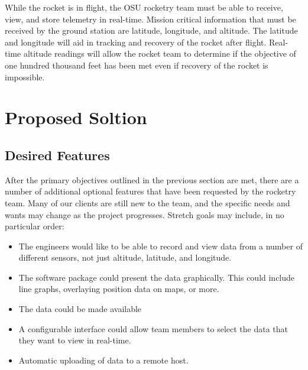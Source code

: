 \documentclass[10pt,journal,draftclsnofoot,onecolumn]{IEEEtran}
\begin{document}
While the rocket is in flight, the \ac{OSU} rocketry team
must be able to receive, view, and store telemetry in real-time.
Mission critical information that must be received by the ground
station are latitude, longitude, and altitude. The latitude
and longitude will aid in tracking and recovery of the rocket
after flight. Real-time altitude readings will allow the rocket
team to determine if the objective of one hundred thousand feet
has been met even if recovery of the rocket is impossible.


\section{Proposed Soltion}

\subsection{Desired Features}
After the primary objectives outlined in the previous section
are met, there are a number of additional optional features
that have been requested by the rocketry team.
Many of our clients are still new to the team, and the specific
needs and wants may change as the project progresses.
Stretch goals may include, in no particular order:

\begin{itemize}
\item The engineers would like to be able to record and view data
from a number of different sensors, not just altitude,
latitude, and longitude.

\item The software package could present the data graphically.
This could include line graphs, overlaying position data
on maps, or more.

\item The data could be made available 

\item A configurable interface could allow team members
to select the data that they want to view in real-time.

\item Automatic uploading of data to a remote host.

\end{itemize}
\end{document}

